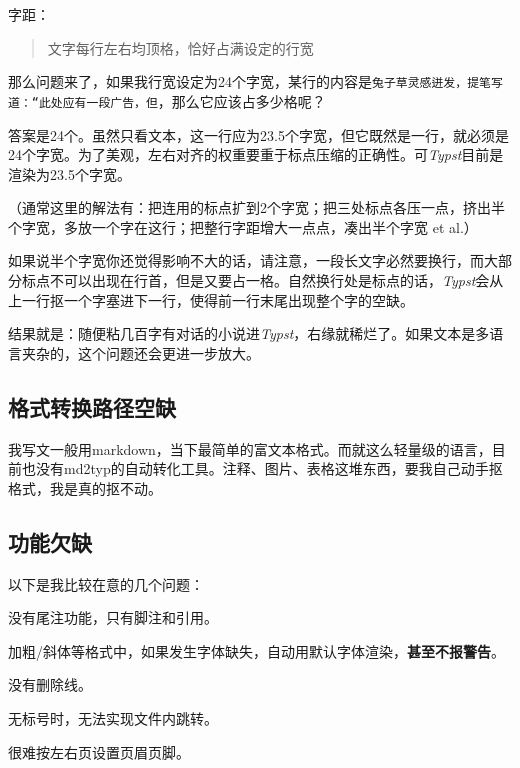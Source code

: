 \documentclass[10pt,openany]{book}
\begin{document}
\begin{sloppypar}
    字距：

    \begin{quote} 文字每行左右均顶格，恰好占满设定的行宽 \end{quote}

    那么问题来了，如果我行宽设定为24个字宽，某行的内容是\texttt{兔子草灵感迸发，提笔写道：“此处应有一段广告，但}，那么它应该占多少格呢？

    答案是24个。虽然只看文本，这一行应为23.5个字宽，但它既然是一行，就必须是24个字宽。为了美观，左右对齐的权重要重于标点压缩的正确性。可\emph{Typst}目前是渲染为23.5个字宽。

    （通常这里的解法有：把连用的标点扩到2个字宽；把三处标点各压一点，挤出半个字宽，多放一个字在这行；把整行字距增大一点点，凑出半个字宽 et al.）

    如果说半个字宽你还觉得影响不大的话，请注意，一段长文字必然要换行，而大部分标点不可以出现在行首，但是又要占一格。自然换行处是标点的话，\emph{Typst}会从上一行抠一个字塞进下一行，使得前一行末尾出现整个字的空缺。

    结果就是：随便粘几百字有对话的小说进\emph{Typst}，右缘就稀烂了。如果文本是多语言夹杂的，这个问题还会更进一步放大。

    \subsection{格式转换路径空缺}

    我写文一般用markdown，当下最简单的富文本格式。而就这么轻量级的语言，目前也没有md2typ的自动转化工具。注释、图片、表格这堆东西，要我自己动手抠格式，我是真的抠不动。

    \subsection{功能欠缺}

    以下是我比较在意的几个问题：

    \begin{tightenum}
        \item   没有尾注功能，只有脚注和引用。
        \item   加粗/斜体等格式中，如果发生字体缺失，自动用默认字体渲染，\textbf{甚至不报警告}。
        \item   没有删除线。
        \item   无标号时，无法实现文件内跳转。
        \item   很难按左右页设置页眉页脚。
    \end{tightenum}


\end{sloppypar}
\end{document}
